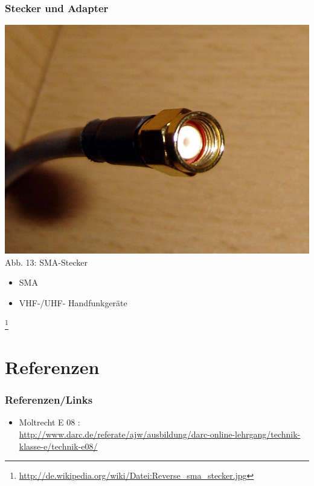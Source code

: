 \begin{frame}
\frametitle{Stecker und Adapter}
\begin{center}
	\includegraphics[scale=0.25]{e10/sma.jpg}\\
	Abb. 13: SMA-Stecker
	\begin{itemize}
		\item SMA
		\item VHF-/UHF- Handfunkgeräte
	\end{itemize}	 
	\footnote{\url{http://de.wikipedia.org/wiki/Datei:Reverse_sma_stecker.jpg}}
\end{center}
\end{frame}

\section*{Referenzen}
\begin{frame}
    \frametitle{Referenzen/Links}
    
    \footnotesize
    \begin{itemize}
        \item Moltrecht E 08 : \\
              \url{http://www.darc.de/referate/ajw/ausbildung/darc-online-lehrgang/technik-klasse-e/technik-e08/}      
    \end{itemize}

\end{frame}


